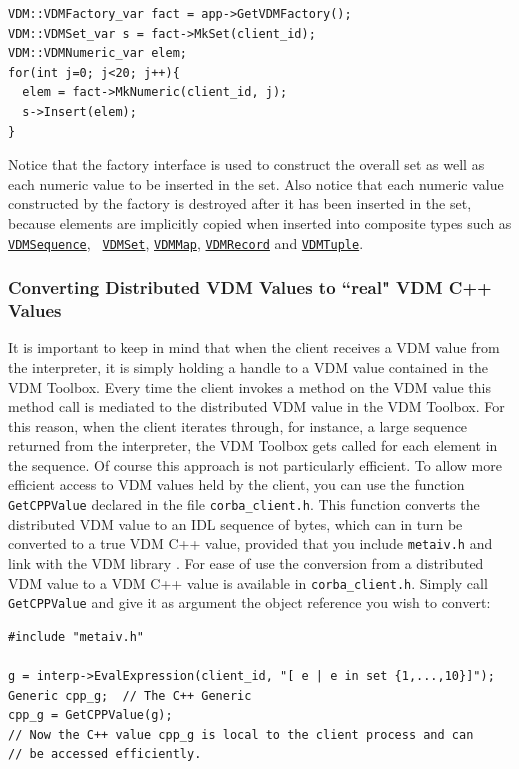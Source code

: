 \documentclass[\pformat,12pt]{article}
\newcommand{\Generic}{\hyperlink{interface.Generic}{Generic}}
\newcommand{\VDMMap}{\hyperlink{interface.VDMMap}{VDMMap}}
\newcommand{\VDMRecord}{\hyperlink{interface.VDMRecord}{VDMRecord}}
\newcommand{\VDMSequence}{\hyperlink{interface.VDMSequence}{VDMSequence}}
\newcommand{\VDMSet}{\hyperlink{interface.VDMSet}{VDMSet}}
\newcommand{\VDMTuple}{\hyperlink{interface.VDMTuple}{VDMTuple}}
\begin{document}
\begin{verbatim}
VDM::VDMFactory_var fact = app->GetVDMFactory();
VDM::VDMSet_var s = fact->MkSet(client_id);
VDM::VDMNumeric_var elem;
for(int j=0; j<20; j++){
  elem = fact->MkNumeric(client_id, j);
  s->Insert(elem);
}
\end{verbatim}

Notice that the factory interface is used to construct the overall set
as well as each numeric value to be inserted in the set. Also notice
that each numeric value constructed by the factory is destroyed after it has
been inserted in the set, because elements are implicitly copied when
inserted into composite types such as {\tt \VDMSequence}, {\tt
  \VDMSet}, {\tt \VDMMap}, {\tt \VDMRecord} and {\tt \VDMTuple}. 

\subsubsection{Converting Distributed VDM Values to ``real" VDM C++ Values}

It is important to keep in mind that when the client receives a VDM
value from the interpreter, it is simply holding a handle to a VDM 
value contained in the VDM Toolbox. Every time the client invokes a
method on the VDM value this method call is mediated to the
distributed VDM value in the VDM Toolbox. For this reason, when the
client iterates through, for instance, a large sequence returned from
the interpreter, the VDM Toolbox gets called for each element in the
sequence. Of course this approach is not particularly efficient. To
allow more efficient access to VDM values held by the client, you can
use 
the function {\tt GetCPPValue} declared in
the file \texttt{corba\_client.h}. This
function converts the distributed VDM value to an IDL sequence of
bytes, which can in turn be converted to a true VDM C++ value,
provided that you include {\tt metaiv.h} and link with the VDM
library \cite{LibMan-SCSK}. For ease of use the conversion from a distributed VDM value
to a VDM C++ value is available in {\tt corba\_client.h}. Simply call
{\tt GetCPPValue} and give it as argument the object reference you
wish to convert:
\begin{verbatim}
#include "metaiv.h"

g = interp->EvalExpression(client_id, "[ e | e in set {1,...,10}]");
Generic cpp_g;  // The C++ Generic
cpp_g = GetCPPValue(g);
// Now the C++ value cpp_g is local to the client process and can
// be accessed efficiently. 
\end{verbatim}
\end{document}
